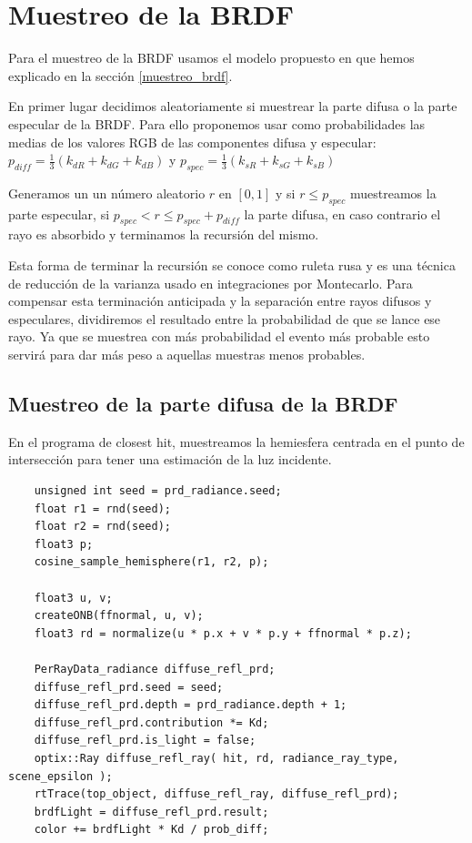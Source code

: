 \clearpage

\section{Muestreo de la BRDF}

Para el muestreo de la BRDF usamos el modelo propuesto en \cite{Lafortune1994} que hemos explicado en la sección \ref{muestreo_brdf}.
\medskip

En primer lugar decidimos aleatoriamente si muestrear la parte difusa o la parte especular de la BRDF. Para ello proponemos usar como probabilidades las medias de los valores RGB de las componentes difusa y especular: $p_{diff} =\frac{1}{3}( k_{dR} + k_{dG} + k_{dB})$ y $p_{spec} =\frac{1}{3}( k_{sR} + k_{sG} + k_{sB})$ 

\medskip

Generamos un un número aleatorio $r$ en $[0,1]$ y si $r \leq p_{spec}$ muestreamos la parte especular, si $p_{spec} < r \leq p_{spec} + p_{diff}$ la parte difusa, en caso contrario el rayo es absorbido y terminamos la recursión del mismo.

\medskip

Esta forma de terminar la recursión se conoce como ruleta rusa y es una técnica de reducción de la varianza usado en integraciones por Montecarlo. Para compensar esta terminación anticipada y la separación entre rayos difusos y especulares, dividiremos el resultado entre la probabilidad de que se lance ese rayo. Ya que se muestrea con más probabilidad el evento más probable esto servirá para dar más peso a aquellas muestras menos probables.

\subsection{Muestreo de la parte difusa de la BRDF}
En el programa de closest hit, muestreamos la hemiesfera centrada en el punto de intersección para tener una estimación de la luz incidente.

\begin{lstlisting}
	unsigned int seed = prd_radiance.seed;
	float r1 = rnd(seed);
	float r2 = rnd(seed);
	float3 p;
	cosine_sample_hemisphere(r1, r2, p);
	
	float3 u, v;
	createONB(ffnormal, u, v);
	float3 rd = normalize(u * p.x + v * p.y + ffnormal * p.z);
		
	PerRayData_radiance diffuse_refl_prd;
	diffuse_refl_prd.seed = seed;
	diffuse_refl_prd.depth = prd_radiance.depth + 1;
	diffuse_refl_prd.contribution *= Kd;
	diffuse_refl_prd.is_light = false;
	optix::Ray diffuse_refl_ray( hit, rd, radiance_ray_type, scene_epsilon );
	rtTrace(top_object, diffuse_refl_ray, diffuse_refl_prd);
	brdfLight = diffuse_refl_prd.result;
	color += brdfLight * Kd / prob_diff;
\end{lstlisting}

